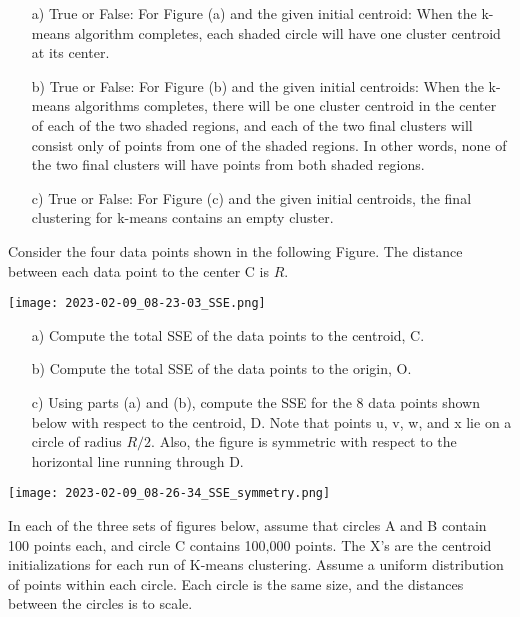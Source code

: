 \documentclass[11pt]{article}
\begin{document}
\begin{itemize}
\begin{itemize}
\item[a)]	True or False: For Figure (a) and the given initial centroid: When the k-means algorithm completes, each shaded circle will have one cluster centroid at its center.
\item[b)]	True or False: For Figure (b) and the given initial centroids: When the k-means algorithms completes, there will be one cluster centroid in the center of each of the two shaded regions, and each of the two final clusters will consist only of points from one of the shaded regions. In other words, none of the two final clusters will have points from both shaded regions.
\item[c)]True or False:   For Figure (c) and the given initial centroids, the final clustering for k-means contains an empty cluster.
\end{itemize}
Consider the four data points shown in the following Figure. The distance between each data point to the center C is $R$.
\begin{center}
\texttt{[image: 2023-02-09\_08-23-03\_SSE.png]}
\end{center}
\begin{enumerate}
  \item[a)]	Compute the total SSE of the data points to the centroid, C.
  \item[b)]	Compute the total SSE of the data points to the origin, O.
  \item[c)]	Using parts (a) and (b), compute the SSE for the 8 data points shown below with respect to the centroid, D. Note that points u, v, w, and x lie on a circle of radius $R/2$. Also, the figure is symmetric with respect to the horizontal line running through D.
\end{enumerate}
\begin{center}
\texttt{[image: 2023-02-09\_08-26-34\_SSE\_symmetry.png]}
\end{center}
In each of the three sets of figures below, assume that circles A and B contain 100 points each, and circle C contains 100,000 points. The X’s are the centroid initializations for each run of K-means clustering. Assume a uniform distribution of points within each circle. Each circle is the same size, and the distances between the circles is to scale.


\end{itemize}
\end{document}
